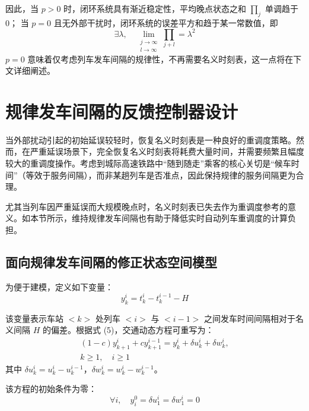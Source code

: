 因此，当 $p>0$ 时，闭环系统具有渐近稳定性，平均晚点状态之和 $\prod_{j}$ 单调趋于 0；  
当 $p=0$ 且无外部干扰时，闭环系统的误差平方和趋于某一常数值，即
\begin{equation*}
	\exists \lambda, \quad \lim_{\substack{j \to \infty \\ l \to \infty}} \prod_{j+l} = \lambda^{2}
\end{equation*}
$p = 0$ 意味着仅考虑列车发车间隔的规律性，不再需要名义时刻表，这一点将在下文详细阐述。

\section{规律发车间隔的反馈控制器设计}
\label{section:4}
当外部扰动引起的初始延误较轻时，恢复名义时刻表是一种良好的重调度策略。然而，在严重延误场景下，完全恢复名义时刻表将耗费大量时间，并需要频繁且幅度较大的重调度操作。考虑到城际高速铁路中“随到随走”乘客的核心关切是“候车时间”（等效于服务间隔），而非某趟列车是否准点，因此保持规律的服务间隔更为合理。

尤其当列车因严重延误而大规模晚点时，名义时刻表已失去作为重调度参考的意义。如本节所示，维持规律发车间隔也有助于降低实时自动列车重调度的计算负担。

\subsection{面向规律发车间隔的修正状态空间模型}
\label{5.5}

为便于建模，定义如下变量：
\begin{equation}
	y_{k}^{i} = t_{k}^{i}-t_{k}^{i-1}-H
\end{equation}

该变量表示车站 $<k>$ 处列车 $<i>$ 与 $<i-1>$ 之间发车时间间隔相对于名义间隔 $H$ 的偏差。根据式 (5)，交通动态方程可重写为：
\begin{equation}
	\begin{array}{r}
		(1-c)y_{k+1}^i +cy_{k+1}^{i-1}=y_{k}^{i}+\delta u_{k}^{i}+\delta w_{k}^{i}, \\
		k \geq 1, \quad i \geq 1
		\label{equ:equ23}
	\end{array}
\end{equation}
其中 $\delta u_{k}^{i} = u_{k}^{i}-u_{k}^{i-1}$，$\delta w_{k}^{i} = w_{k}^{i}-w_{k}^{i-1}$。

该方程的初始条件为零：
\begin{equation*}
	\forall i, \quad y_{i}^{0}= \delta u_{1}^{i}=\delta w_{1}^{i}=0
\end{equation*}

